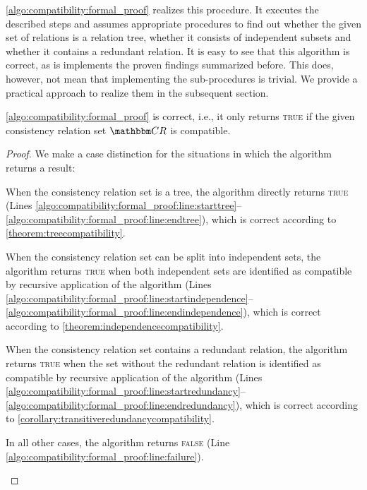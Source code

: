 \begin{algorithm}
    
    \caption[Proof for compatibility of consistency relations]{Proof for compatibility of consistency relations.}
    \label{algo:compatibility:formal_proof}
\end{algorithm}

\autoref{algo:compatibility:formal_proof} realizes this procedure.
It executes the described steps and assumes appropriate procedures to find out whether the given set of relations is a relation tree, whether it consists of independent subsets and whether it contains a redundant relation.
It is easy to see that this algorithm is correct, as is implements the proven findings summarized before.
This does, however, not mean that implementing the sub-procedures is trivial.
We provide a practical approach to realize them in the subsequent section.

\begin{theorem}
    \label{theorem:compatibilityalgorithmcorrectness}
    \autoref{algo:compatibility:formal_proof} is correct, i.e., it only returns \textsc{true} if the given consistency relation set $\consistencyrelationset{CR}$ is compatible.
\end{theorem}
%
\begin{proof}
    We make a case distinction for the situations in which the algorithm returns a result:
    \begin{longenumerate}
        \item When the consistency relation set is a tree, the algorithm directly returns \textsc{true} (Lines \ref{algo:compatibility:formal_proof:line:starttree}--\ref{algo:compatibility:formal_proof:line:endtree}), which is correct according to \autoref{theorem:treecompatibility}.
        \item When the consistency relation set can be split into independent sets, the algorithm returns \textsc{true} when both independent sets are identified as compatible by recursive application of the algorithm (Lines \ref{algo:compatibility:formal_proof:line:startindependence}--\ref{algo:compatibility:formal_proof:line:endindependence}), which is correct according to \autoref{theorem:independencecompatibility}.
        \item When the consistency relation set contains a redundant relation, the algorithm returns \textsc{true} when the set without the redundant relation is identified as compatible by recursive application of the algorithm (Lines \ref{algo:compatibility:formal_proof:line:startredundancy}--\ref{algo:compatibility:formal_proof:line:endredundancy}), which is correct according to \autoref{corollary:transitiveredundancycompatibility}.
        \item In all other cases, the algorithm returns \textsc{false} (Line \ref{algo:compatibility:formal_proof:line:failure}).
        \qedhere
    \end{longenumerate}
\end{proof}

